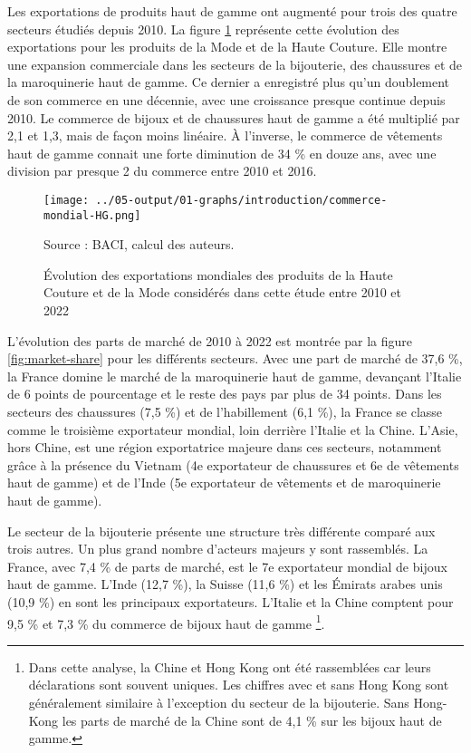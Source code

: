 \documentclass[french,10pt,a4paper]{article}
\begin{document}
Les exportations de produits haut de gamme ont augmenté pour trois des quatre secteurs étudiés depuis 2010. La figure \ref{fig:commerce-mondial-HG} représente cette évolution des exportations pour les produits de la Mode et de la Haute Couture. Elle montre une expansion commerciale dans les secteurs de la bijouterie, des chaussures et de la maroquinerie haut de gamme. Ce dernier a enregistré plus qu'un doublement de son commerce en une décennie, avec une croissance presque continue depuis 2010. Le commerce de bijoux et de chaussures haut de gamme a été multiplié par 2,1 et 1,3, mais de façon moins linéaire. À l'inverse, le commerce de vêtements haut de gamme connait une forte diminution de 34 \% en douze ans, avec une division par presque 2 du commerce entre 2010 et 2016.

\begin{figure}[!h]
  \centering
  \texttt{[image: ../05-output/01-graphs/introduction/commerce-mondial-HG.png]}
  \captionsetup{justification=raggedright,singlelinecheck=false, font=small}
  \caption*{Source : BACI, calcul des auteurs.}
  \captionsetup{justification=centering, singlelinecheck=true, font=normalsize}
  \caption{Évolution des exportations mondiales des produits de la Haute Couture et de la Mode considérés dans cette étude entre 2010 et 2022}
  \label{fig:commerce-mondial-HG}
\end{figure}

\bigskip

L'évolution des parts de marché de 2010 à 2022 est montrée par la figure \ref{fig:market-share} pour les différents secteurs. Avec une part de marché de 37,6 \%, la France domine le marché de la maroquinerie haut de gamme, devançant l'Italie de 6 points de pourcentage et le reste des pays par plus de 34 points. Dans les secteurs des chaussures (7,5 \%) et de l'habillement (6,1 \%), la France se classe comme le troisième exportateur mondial, loin derrière l'Italie et la Chine. L'Asie, hors Chine, est une région exportatrice majeure dans ces secteurs, notamment grâce à la présence du Vietnam (4e exportateur de chaussures et 6e de vêtements haut de gamme) et de l'Inde (5e exportateur de vêtements et de maroquinerie haut de gamme). 

Le secteur de la bijouterie présente une structure très différente comparé aux trois autres. Un plus grand nombre d'acteurs majeurs y sont rassemblés. La France, avec 7,4 \% de parts de marché, est le 7e exportateur mondial de bijoux haut de gamme. L'Inde (12,7 \%), la Suisse (11,6 \%) et les Émirats arabes unis (10,9 \%) en sont les principaux exportateurs. L'Italie et la Chine comptent pour 9,5 \% et 7,3 \% du commerce de bijoux haut de gamme \footnote{Dans cette analyse, la Chine et Hong Kong ont été rassemblées car leurs déclarations sont souvent uniques. Les chiffres avec et sans Hong Kong sont généralement similaire à l'exception du secteur de la bijouterie. Sans Hong-Kong les parts de marché de la Chine sont de 4,1 \% sur les bijoux haut de gamme.}.
\end{document}
